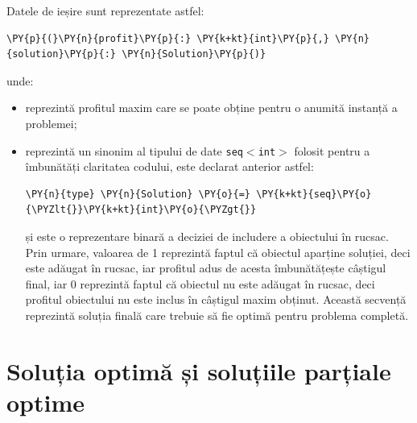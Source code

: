 \begin{sloppypar}
Datele de ieșire sunt reprezentate astfel:
\begin{Verbatim}[commandchars=\\\{\}]
                \PY{p}{(}\PY{n}{profit}\PY{p}{:} \PY{k+kt}{int}\PY{p}{,} \PY{n}{solution}\PY{p}{:} \PY{n}{Solution}\PY{p}{)}
\end{Verbatim}
unde:
\begin{itemize}
    \item {} reprezintă profitul maxim care se poate obține pentru o anumită instanță a problemei;
    \item {} reprezintă un sinonim al tipului de date \texttt{seq\(<\)int\(>\)} folosit pentru a îmbunătăți claritatea codului, este declarat anterior astfel:
\begin{Verbatim}[commandchars=\\\{\}]
                \PY{n}{type} \PY{n}{Solution} \PY{o}{=} \PY{k+kt}{seq}\PY{o}{\PYZlt{}}\PY{k+kt}{int}\PY{o}{\PYZgt{}}
\end{Verbatim}
și este o reprezentare binară a deciziei de includere a obiectului în rucsac. Prin urmare, valoarea de 1 reprezintă faptul că obiectul aparține soluției, deci este adăugat în rucsac, iar profitul adus de acesta îmbunătățește câștigul final, iar 0 reprezintă faptul că obiectul nu este adăugat în rucsac, deci profitul obiectului nu este inclus în câștigul maxim obținut. Această secvență reprezintă soluția finală care trebuie să fie optimă pentru problema completă.
\end{itemize} 

\section{Soluția optimă și soluțiile parțiale optime}


\end{sloppypar}
